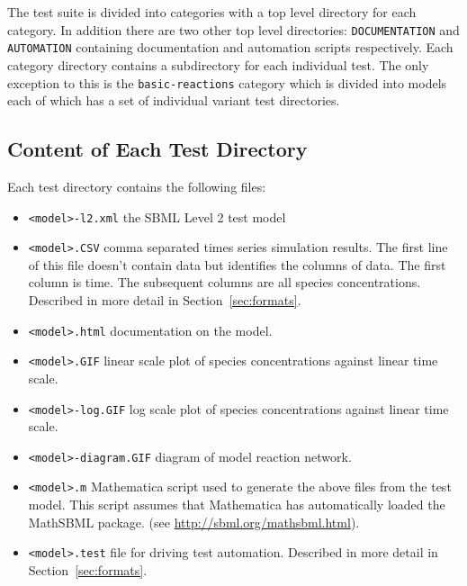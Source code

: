 \documentclass{cekarticle}
\begin{document}
The test suite is divided into categories with a top level
directory for each category.  In addition there are two other top
level directories: \texttt{DOCUMENTATION} and \texttt{AUTOMATION}
containing documentation and automation scripts respectively. Each
category directory contains a subdirectory for each individual
test.  The only exception to this is the \texttt{basic-reactions}
category which is divided into models each of which has a set of
individual variant test directories.

\subsection{Content of Each Test Directory}
\label{sec:test-directory}

Each test directory contains the following files:

\begin{itemize}

\item \texttt{<model>-l2.xml} the SBML Level 2 test model

\item \texttt{<model>.CSV} comma separated times series simulation
results.  The first line of this file doesn't contain data but
identifies the columns of data.  The first column is time.  The
subsequent columns are all species concentrations.  Described in
more detail in Section~\ref{sec:formats}.

\item \texttt{<model>.html} documentation on the model.

\item \texttt{<model>.GIF} linear scale plot of species
concentrations against linear time scale.

\item \texttt{<model>-log.GIF} log scale plot of species
concentrations against linear time scale.

\item \texttt{<model>-diagram.GIF} diagram of model reaction
network.

\item \texttt{<model>.m} Mathematica script used to generate the
above files from the test model.  This script assumes that
Mathematica has automatically loaded the MathSBML package.  (see
\url{http://sbml.org/mathsbml.html}).

\item \texttt{<model>.test} file for driving test automation.
Described in more detail in Section~\ref{sec:formats}.

\end{itemize}
\end{document}

